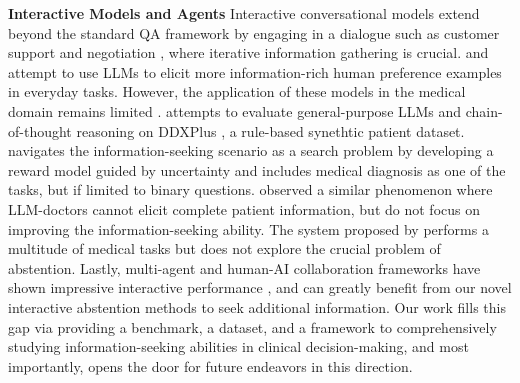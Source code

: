 \documentclass{article}
\begin{document}
\textbf{Interactive Models and Agents}\hspace{2mm}
Interactive conversational models extend beyond the standard QA framework by engaging in a dialogue such as customer support and negotiation \citep{singh2022survey, chakrabarti2015artificial, he2018decoupling, abdelnabi2023llmdeliberation, ju2024globettglanguagedrivenguaranteed}, where iterative information gathering is crucial. \citet{li2023eliciting} and \citet{andukuri2024stargate} attempt to use LLMs to elicit more information-rich human preference examples in everyday tasks. 
However, the application of these models in the medical domain remains limited \citep{li2021semi}. \citet{wu2023large} attempts to evaluate general-purpose LLMs and chain-of-thought reasoning on DDXPlus \citep{fansi2022ddxplus}, a rule-based synethtic patient dataset. \citet{hu2024uncertainty} navigates the information-seeking scenario as a search problem by developing a reward model guided by uncertainty and includes medical diagnosis as one of the tasks, but if limited to binary questions. \citet{johri2023testing} observed a similar phenomenon where LLM-doctors cannot elicit complete patient information, but do not focus on improving the information-seeking ability. The system proposed by \citep{tu2024conversational} performs a multitude of medical tasks but does not explore the crucial problem of abstention. 
Lastly, multi-agent and human-AI collaboration frameworks have shown impressive interactive performance \citep{zhou2024sotopia, wu2024coworkers, wu2023autogen, deng2024humancentered, lin2024decisionoriented}, and can greatly benefit from our novel interactive abstention methods to seek additional information.
Our work fills this gap via providing a benchmark, a dataset, and a framework to comprehensively studying information-seeking abilities in clinical decision-making, and most importantly, opens the door for future endeavors in this direction.
\end{document}
